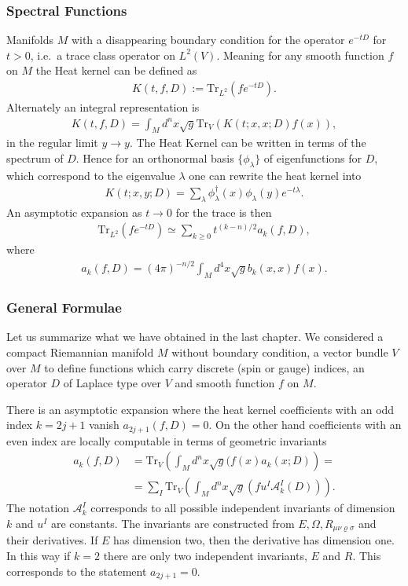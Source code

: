 \subsubsection{Spectral Functions}
Manifolds $M$ with a disappearing boundary condition for the operator
$e^{-tD}$ for $t>0$, i.e.\ a trace class operator on $L^2(V)$. Meaning for any
smooth function $f$ on $M$ the Heat kernel can be defined as
\begin{align}
    K(t,f,D) := \text{Tr}_{L^2}(fe^{-tD}).
\end{align}
Alternately an integral representation is
\begin{align}
    K(t, f, D) = \int_M d^n x \sqrt{g} \text{Tr}_V(K(t;x,x;D)f(x)),
\end{align}
in the regular limit $y \rightarrow y$. The Heat Kernel can be written in terms
of the spectrum of $D$. Hence for an orthonormal basis $\{\phi_\lambda\}$ of
eigenfunctions for $D$, which correspond to the eigenvalue $\lambda$ one
can rewrite the heat kernel into
\begin{align}
    K(t;x,y;D) = \sum_\lambda \phi^\dagger_\lambda(x)
    \phi_\lambda(y)e^{-t\lambda}.
\end{align}
An asymptotic expansion as $t \rightarrow 0$ for the trace is then
\begin{align}
    \text{Tr}_{L^2}(fe^{-tD}) \simeq \sum_{k\geq 0}t^{(k-n)/2}a_k(f,D),
\end{align}
where
\begin{align}
    a_k(f,D) = (4\pi)^{-n/2} \int_M d^4x \sqrt{g} b_k(x,x) f(x).
\end{align}
\subsubsection{General Formulae}
Let us summarize what we have obtained in the last chapter. We considered a
compact Riemannian manifold $M$ without boundary condition, a vector bundle
$V$ over $M$ to define functions which carry discrete (spin or gauge)
indices, an operator $D$ of Laplace type over $V$ and smooth function $f$ on
$M$.

There is an asymptotic expansion where the heat kernel coefficients with an
odd index $k=2j+1$ vanish $a_{2j+1}(f,D) = 0$. On the other hand coefficients
with an even index are locally computable in terms of geometric invariants
\begin{align}
    a_k(f,D) &= \text{Tr}_V\left(\int_M d^n x\sqrt{g}(f(x)a_k(x;D)\right)
    =\nonumber\\
    &=\sum_I \text{Tr}_V\left(\int_M d^nx \sqrt{g}(fu^I
    \mathcal{A}^I_k(D))\right).
\end{align}
The notation $\mathcal{A}^I_k$ corresponds to all possible independent invariants of
dimension $k$ and $u^I$ are constants. The invariants are constructed from
$E, \Omega, R_{\mu\nu\varrho\sigma}$ and their derivatives. If $E$ has
dimension two, then the derivative has dimension one. In this way if $k=2$ there are
only two independent invariants, $E$ and $R$. This corresponds to the
statement $a_{2j+1}=0$.

